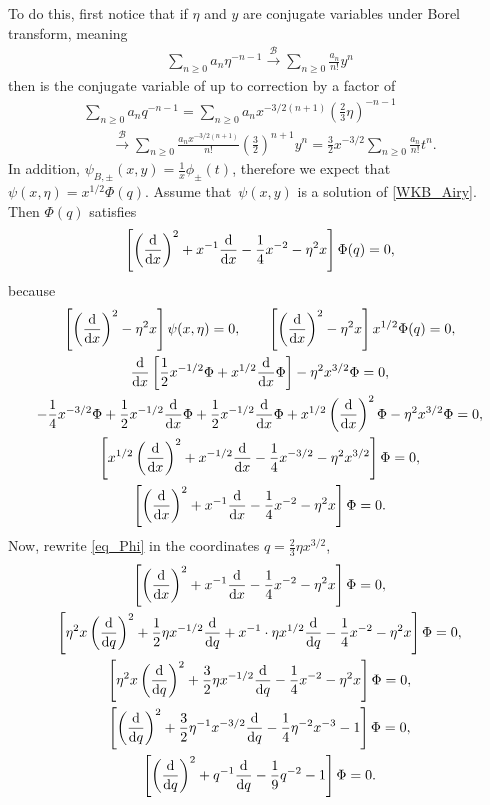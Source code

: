 \documentclass[pdftex]{sigma}
\newcommand{\borel}{\mathcal{B}}
\numberwithin{equation}{section}
\begin{document}
To do this, first notice that if $\eta$ and $y$ are conjugate variables under Borel transform, meaning
\begin{align*}
\sum_{n\geq 0}a_n\eta^{-n-1} \overset{\borel}{\longrightarrow} \sum_{n\geq 0}\frac{a_n}{n!} y^{n}
\end{align*}
then  is the conjugate variable of  up to correction by a factor of 
\begin{gather*}
\sum_{n\geq 0}a_nq^{-n-1}=\sum_{n\geq 0}a_nx^{-3/2(n+1)}\left(\frac{2}{3}\eta\right)^{-n-1}\\
\qquad \overset{\borel}{\longrightarrow} \sum_{n\geq 0}\frac{a_nx^{-3/2(n+1)}}{n!}\left(\frac{3}{2}\right)^{n+1} y^{n}=\frac{3}{2}x^{-3/2}\sum_{n\geq 0}\frac{a_n}{n!} t^{n}.
\end{gather*}
In addition, $\psi_{B,\pm}(x,y)=\frac{1}{x}\phi_{\pm}(t)$, therefore we expect that $\psi(x,\eta)=x^{1/2}\Phi(q)$. Assume that~$\psi(x,y)$ is a solution of \eqref{WKB_Airy}. Then $\Phi(q)$ satisfies
\begin{equation}
\label{eq_Phi}
\left[\left(\frac{\rm d}{{\rm d}x}\right)^2+x^{-1}\frac{\rm d}{{\rm d}x}-\frac{1}{4}x^{-2} - \eta^2 x \right] \Phi(q) = 0,
\end{equation}
because
\begin{gather*}
\left[\left(\frac{\rm d}{{\rm d}x}\right)^2 - \eta^2 x \right] \psi(x, \eta) = 0,\qquad
\left[\left(\frac{\rm d}{{\rm d}x}\right)^2 - \eta^2 x \right] x^{1/2}\Phi(q) = 0,\\
\frac{\rm d}{{\rm d}x}\left[\frac{1}{2}x^{-1/2}\Phi+x^{1/2}\frac{\rm d}{{\rm d}x}\Phi\right]-\eta^2x^{3/2}\Phi=0,\\
-\frac{1}{4}x^{-3/2}\Phi+\frac{1}{2}x^{-1/2}\frac{\rm d}{{\rm d}x}\Phi+\frac{1}{2}x^{-1/2}\frac{\rm d}{{\rm d}x}\Phi+x^{1/2}\left(\frac{\rm d}{{\rm d}x}\right)^2\Phi-\eta^2x^{3/2}\Phi=0,\\
\left[x^{1/2}\left(\frac{\rm d}{{\rm d}x}\right)^2+x^{-1/2}\frac{\rm d}{{\rm d}x}-\frac{1}{4}x^{-3/2}-\eta^2x^{3/2}\right]\Phi=0,\\
\left[\left(\frac{\rm d}{{\rm d}x}\right)^2+x^{-1}\frac{\rm d}{{\rm d}x}-\frac{1}{4}x^{-2}-\eta^2x\right]\Phi=0.
\end{gather*}
%
Now, rewrite \eqref{eq_Phi} in the coordinates $q=\frac{2}{3}\eta x^{3/2}$,
\begin{gather*}
\left[\left(\frac{\rm d}{{\rm d}x}\right)^2+x^{-1}\frac{\rm d}{{\rm d}x}-\frac{1}{4}x^{-2}-\eta^2x\right]\Phi=0,\\
\left[\eta^2x\left(\frac{\rm d}{{\rm d}q}\right)^2+\frac{1}{2}\eta x^{-1/2}\frac{\rm d}{{\rm d}q}+x^{-1}\cdot \eta x^{1/2}\frac{\rm d}{{\rm d}q}-\frac{1}{4}x^{-2}-\eta^2x\right]\Phi=0,\\
\left[\eta^2x\left(\frac{\rm d}{{\rm d}q}\right)^2+\frac{3}{2}\eta x^{-1/2}\frac{\rm d}{{\rm d}q}-\frac{1}{4}x^{-2}-\eta^2x\right]\Phi=0,\\
\left[\left(\frac{\rm d}{{\rm d}q}\right)^2+\frac{3}{2}\eta^{-1} x^{-3/2}\frac{\rm d}{{\rm d}q}-\frac{1}{4}\eta^{-2}x^{-3}-1\right]\Phi=0,\\
\left[\left(\frac{\rm d}{{\rm d}q}\right)^2+q^{-1}\frac{\rm d}{{\rm d}q}-\frac{1}{9}q^{-2}-1\right]\Phi=0.
\end{gather*}
\end{document}
